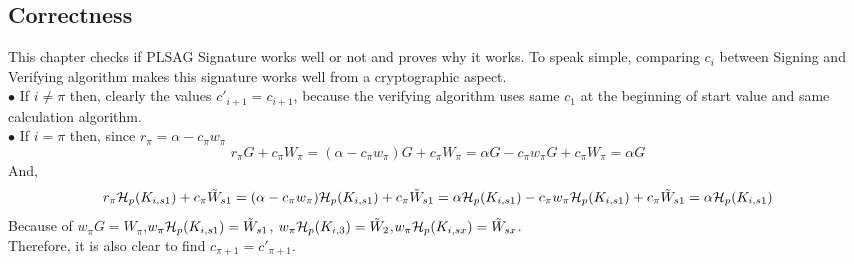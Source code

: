 \subsection{Correctness}
    This chapter checks if PLSAG Signature works well or not and proves why it works. To speak simple, comparing $c_{i}$ between Signing and Verifying algorithm makes this signature works well from a cryptographic aspect.\\
    $\bullet$ If $i\neq \pi $ then, clearly the values $c'_{i+1}=c_{i+1}$, 
    because the verifying algorithm uses same $c_{1}$ at the beginning of start value and same calculation algorithm.\\
    $\bullet$ If $i=\pi$ then, since $r_{\pi}=\alpha - c_{\pi}w_{\pi}$\\
    $$r_{\pi}G+c_{\pi}W_{\pi}=(\alpha - c_{\pi}w_{\pi})G+ c_{\pi}W_{\pi}=\alpha G - c_{\pi}w_{\pi}G + c_{\pi}W_{\pi}=\alpha G$$
    And,
    $$r_{\pi}{\cal H}_{p}(K_{i,s1})+c_{\pi} \tilde{W}_{s1}= (\alpha - c_{\pi}w_{\pi}){\cal H}_{p}(K_{i,s1})+c_{\pi} \tilde{W}_{s1}= \alpha {\cal H}_{p}(K_{i,s1}) - c_{\pi}w_{\pi}{\cal H}_{p}(K_{i,s1})+c_{\pi} \tilde{W}_{s1}= \alpha {\cal H}_{p}(K_{i,s1})$$
    Because of $w_{\pi}G=W_{\pi}$,$w_{\pi}{\cal H}_{p}(K_{i,s1})=\tilde{W}_{s1}$, $w_{\pi}{\cal H}_{p}(K_{i,3})=\tilde{W}_{2}$,$w_{\pi}{\cal H}_{p}(K_{i,sx})=\tilde{W}_{sx}$.\\
    Therefore, it is also clear to find $c_{\pi + 1}=c'_{\pi +1}$.

